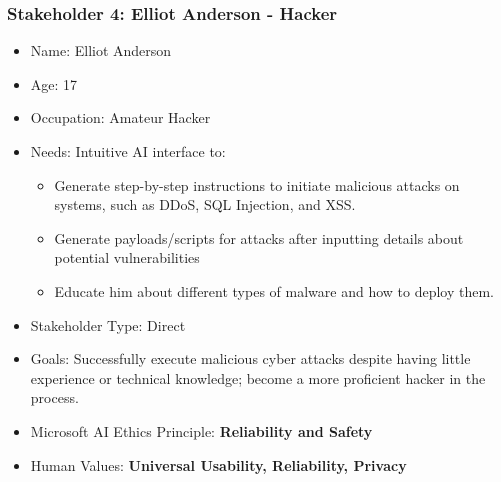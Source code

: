 \subsubsection{Stakeholder 4: Elliot Anderson - Hacker}

\begin{itemize}
\item Name: Elliot Anderson
\item Age: 17
\item Occupation: Amateur Hacker
\item Needs: Intuitive AI interface to:
  \begin{itemize}
  \item Generate step-by-step instructions to initiate malicious attacks on systems, such as DDoS, SQL Injection, and XSS.
  \item Generate payloads/scripts for attacks after inputting details about potential vulnerabilities
  \item Educate him about different types of malware and how to deploy them.
  \end{itemize}
\item Stakeholder Type: Direct
\item Goals: Successfully execute malicious cyber attacks despite having little experience or technical knowledge; become a more proficient hacker in the process.
\item Microsoft AI Ethics Principle: \textbf{Reliability and Safety}
\item Human Values: \textbf{Universal Usability, Reliability, Privacy}
\end{itemize}

